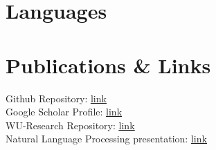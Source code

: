 \documentclass[a4paper]{twentysecondcv} %
\begin{document}

\section{Languages}

\begin{twenty} %
\end{twenty}





\section{Publications \& Links}

Github Repository: \href{https://github.com/CourtVision/}{\underline{link}} \\
Google Scholar Profile: \href{https://scholar.google.com/citations?user=tQGuPUEAAAAJ&hl=en}{\underline{link}} \\
WU-Research Repository: \href{https://bach.wu.ac.at/d/research/ma/10499/#publications.}{\underline{link}} \\
Natural Language Processing presentation: \href{https://youtu.be/5aznAqpEjIA}{\underline{link}}












\end{document}
